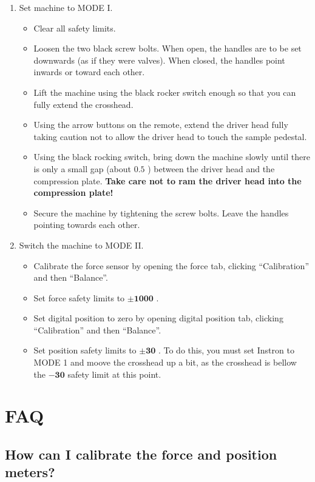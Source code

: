 \documentclass[a4paper]{article}
\begin{document}
\begin{enumerate}
  \item Set machine to \textsf{MODE I}.
  \begin{itemize}
    \item Clear all safety limits.
    \item Loosen the two black screw bolts. When open, the handles are to be set downwards (as if they were valves). When closed, the handles point inwards or toward each other.
    \item Lift the machine using the black rocker switch enough so that you can fully extend the crosshead.
    \item Using the arrow buttons on the remote, extend the driver head fully taking caution not to allow the driver head to touch the sample pedestal.
    \item Using the black rocking switch, bring down the machine slowly until there is only a small gap (about $0.5$ \milli\meter) between the driver head and the compression plate. {\bf Take care not to ram the driver head into the compression plate!}
    \item Secure the machine by tightening the screw bolts. Leave the handles pointing towards each other.
  \end{itemize}
  \item Switch the machine to \textsf{MODE II}.
  \begin{itemize}  
    \item Calibrate the force sensor by opening the force tab, clicking ``Calibration'' and then ``Balance''.
    \item Set force safety limits to $\mathbf{\pm 1000}$ {\bf\newton}.
    \item Set digital position to zero by opening digital position tab, clicking ``Calibration'' and then ``Balance''.
    \item Set position safety limits to $\mathbf{\pm 30}$ {\bf\milli\meter}. To do this, you must set Instron to \textsf{MODE 1} and moove the crosshead up a bit, as the crosshead is bellow the $\mathbf{-30}$ {\bf\milli\meter} safety limit at this point.
  \end{itemize}
\end{enumerate}

\section{FAQ}

\subsection{How can I calibrate the force and position meters?}
\end{document}
